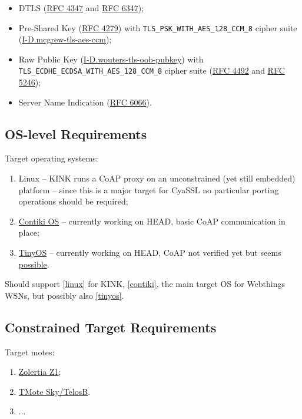 \documentclass[10pt]{article}
\begin{document}
\begin{itemize}
\item DTLS (\href{http://tools.ietf.org/html/rfc4347}{RFC 4347} and \href{http://tools.ietf.org/html/rfc6347}{RFC 6347});
\item Pre-Shared Key (\href{http://tools.ietf.org/html/rfc4279}{RFC 4279}) with \texttt{TLS\_PSK\_WITH\_AES\_128\_CCM\_8} cipher suite (\href{http://tools.ietf.org/html/draft-mcgrew-tls-aes-ccm-ecc-02}{I-D.mcgrew-tls-aes-ccm});
\item Raw Public Key (\href{http://tools.ietf.org/html/draft-wouters-tls-oob-pubkey}{I-D.wouters-tls-oob-pubkey}) with \texttt{TLS\_ECDHE\_ECDSA\_WITH\_AES\_128\_CCM\_8} cipher suite (\href{http://tools.ietf.org/html/rfc4492}{RFC 4492} and \href{http://tools.ietf.org/html/rfc5246}{RFC 5246});
\item Server Name Indication (\href{http://tools.ietf.org/html/rfc6066}{RFC 6066}).
\end{itemize}

\subsection{OS-level Requirements}
\label{sec:reqs-os}
Target operating systems:
\begin{enumerate}
\item\label{linux} Linux -- KINK runs a CoAP proxy on an unconstrained (yet still embedded) platform -- since this is a major target for CyaSSL no particular porting operations should be required;
\item\label{contiki} \href{http://www.contiki-os.org}{Contiki OS} -- currently working on HEAD, basic CoAP communication in place;
\item\label{tinyos} \href{http://www.tinyos.net}{TinyOS} -- currently working on HEAD, CoAP not verified yet but seems \href{http://zolertia.sourceforge.net/wiki/index.php/Blip_v2.0}{possible}.
\end{enumerate}

Should support \ref{linux} for KINK, \ref{contiki}, the main target OS for Webthings WSNs, but possibly also \ref{tinyos}.

\subsection{Constrained Target Requirements}
Target motes:
\begin{enumerate}
\item\label{z1} \href{http://www.zolertia.com/ti}{Zolertia Z1};
\item\label{tmote} \href{http://www.ti.com/tool/msp430-3p-motei-tmotesky-dsgkt}{TMote Sky/TelosB}.
\item ...
\end{enumerate}
\end{document}
